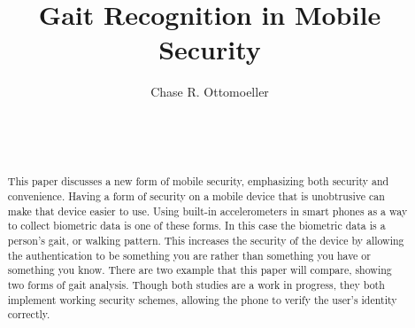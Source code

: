 \documentclass{sig-alternate}
\begin{document}

\title{Gait Recognition in Mobile Security}


\author{
\alignauthor
Chase R. Ottomoeller\\
	\\
	\\
	\\
}

\maketitle




\begin{abstract}
This paper discusses a new form of mobile security, emphasizing both security and convenience. Having a form of security on a mobile device that is unobtrusive can make that device easier to use. Using built-in accelerometers in smart phones as a way to collect biometric data is one of these forms. In this case the biometric data is a person's gait, or walking pattern. This increases the security of the device by allowing the authentication to be something you are rather than something you have or something you know. There are two example that this paper will compare, showing two forms of gait analysis. Though both studies are a work in progress, they both implement working security schemes, allowing the phone to  verify the user's identity correctly.  
\end{abstract}




\end{document}

